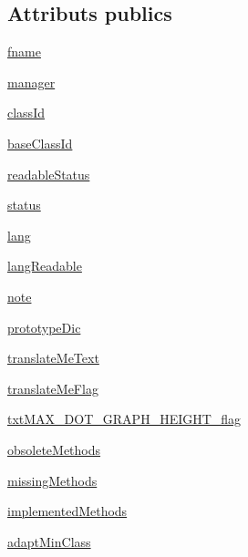 \subsection*{Attributs publics}
\begin{DoxyCompactItemize}
\item 
\hyperlink{classtranslator_1_1_transl_a44af94ad0291f2ebc64e0a2bada408a6}{fname}
\item 
\hyperlink{classtranslator_1_1_transl_a7a4978701f84657c594436e391b9d635}{manager}
\item 
\hyperlink{classtranslator_1_1_transl_a686b3d90f36641d66c0a9e2d0d910be3}{class\+Id}
\item 
\hyperlink{classtranslator_1_1_transl_a5cc2665d401ab4f4e56ef50ed96c8685}{base\+Class\+Id}
\item 
\hyperlink{classtranslator_1_1_transl_af4f42004c204a395e533c9d5f59f06ab}{readable\+Status}
\item 
\hyperlink{classtranslator_1_1_transl_a072e6a1fa236d26915ed6e874b32e8f1}{status}
\item 
\hyperlink{classtranslator_1_1_transl_aaa3cffe4a6bbcefa8c1138dcaaf86953}{lang}
\item 
\hyperlink{classtranslator_1_1_transl_a1699688b7f8834076879c40d451bc585}{lang\+Readable}
\item 
\hyperlink{classtranslator_1_1_transl_a99522a9bde0d3e259a130b1612688542}{note}
\item 
\hyperlink{classtranslator_1_1_transl_a0f14afd000e3b5ce3f95b1533bb9ac30}{prototype\+Dic}
\item 
\hyperlink{classtranslator_1_1_transl_a9e22f71da9dda780a278ea93a85fc8dc}{translate\+Me\+Text}
\item 
\hyperlink{classtranslator_1_1_transl_a35ef06fb423fad142c3b1cabbff55380}{translate\+Me\+Flag}
\item 
\hyperlink{classtranslator_1_1_transl_a896359e684a202535f3e97911140eac6}{txt\+M\+A\+X\+\_\+\+D\+O\+T\+\_\+\+G\+R\+A\+P\+H\+\_\+\+H\+E\+I\+G\+H\+T\+\_\+flag}
\item 
\hyperlink{classtranslator_1_1_transl_a106f9e989b0ac4620917606ebfab9471}{obsolete\+Methods}
\item 
\hyperlink{classtranslator_1_1_transl_a4372f5945c9f587fc4476309b9323f31}{missing\+Methods}
\item 
\hyperlink{classtranslator_1_1_transl_a53700a27a1087271ec937483ca546b17}{implemented\+Methods}
\item 
\hyperlink{classtranslator_1_1_transl_a1719592217189c0d7f60cd96592092ae}{adapt\+Min\+Class}
\end{DoxyCompactItemize}


